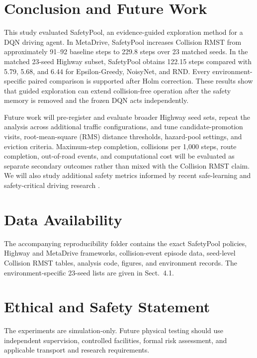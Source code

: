\documentclass[runningheads]{llncs}
\begin{document}
\FloatBarrier
\section{Conclusion and Future Work}

This study evaluated SafetyPool, an evidence-guided exploration method for a DQN driving agent. In MetaDrive, SafetyPool increases Collision RMST from approximately 91--92 baseline steps to 229.8 steps over 23 matched seeds. In the matched 23-seed Highway subset, SafetyPool obtains 122.15 steps compared with 5.79, 5.68, and 6.44 for Epsilon-Greedy, NoisyNet, and RND. Every environment-specific paired comparison is supported after Holm correction. These results show that guided exploration can extend collision-free operation after the safety memory is removed and the frozen DQN acts independently.

Future work will pre-register and evaluate broader Highway seed sets, repeat the analysis across additional traffic configurations, and tune candidate-promotion visits, root-mean-square (RMS) distance thresholds, hazard-pool settings, and eviction criteria. Maximum-step completion, collisions per 1,000 steps, route completion, out-of-road events, and computational cost will be evaluated as separate secondary outcomes rather than mixed with the Collision RMST claim. We will also study additional safety metrics informed by recent safe-learning and safety-critical driving research \cite{brunke2022safe,zhao2022zeroviolation,ji2023safetygymnasium,zhang2023cat,ji2024omnisafe}.

\section*{Data Availability}

The accompanying reproducibility folder contains the exact SafetyPool policies, Highway and MetaDrive frameworks, collision-event episode data, seed-level Collision RMST tables, analysis code, figures, and environment records. The environment-specific 23-seed lists are given in Sect.~4.1.

\section*{Ethical and Safety Statement}

The experiments are simulation-only. Future physical testing should use independent supervision, controlled facilities, formal risk assessment, and applicable transport and research requirements.

\begingroup
\scriptsize
\setlength{\itemsep}{0pt}


\endgroup
\end{document}
